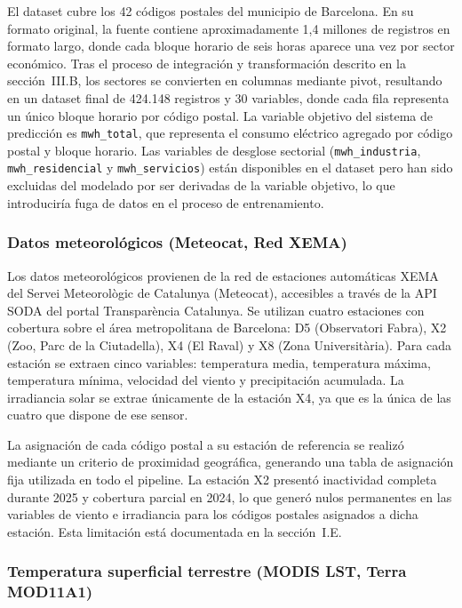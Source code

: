 \documentclass[12pt, a4paper]{article}
\begin{document}
El dataset cubre los 42 códigos postales del municipio de Barcelona. En su formato original, la fuente contiene aproximadamente 1,4 millones de registros en formato largo, donde cada bloque horario de seis horas aparece una vez por sector económico. Tras el proceso de integración y transformación descrito en la sección~III.B, los sectores se convierten en columnas mediante pivot, resultando en un dataset final de 424.148 registros y 30 variables, donde cada fila representa un único bloque horario por código postal. La variable objetivo del sistema de predicción es \texttt{mwh\_total}, que representa el consumo eléctrico agregado por código postal y bloque horario. Las variables de desglose sectorial (\texttt{mwh\_industria}, \texttt{mwh\_residencial} y \texttt{mwh\_servicios}) están disponibles en el dataset pero han sido excluidas del modelado por ser derivadas de la variable objetivo, lo que introduciría fuga de datos en el proceso de entrenamiento.

\subsubsection{Datos meteorológicos (Meteocat, Red XEMA)}

Los datos meteorológicos provienen de la red de estaciones automáticas XEMA del Servei Meteorològic de Catalunya (Meteocat), accesibles a través de la API SODA del portal Transparència Catalunya. Se utilizan cuatro estaciones con cobertura sobre el área metropolitana de Barcelona: D5 (Observatori Fabra), X2 (Zoo, Parc de la Ciutadella), X4 (El Raval) y X8 (Zona Universitària). Para cada estación se extraen cinco variables: temperatura media, temperatura máxima, temperatura mínima, velocidad del viento y precipitación acumulada. La irradiancia solar se extrae únicamente de la estación X4, ya que es la única de las cuatro que dispone de ese sensor.

La asignación de cada código postal a su estación de referencia se realizó mediante un criterio de proximidad geográfica, generando una tabla de asignación fija utilizada en todo el pipeline. La estación X2 presentó inactividad completa durante 2025 y cobertura parcial en 2024, lo que generó nulos permanentes en las variables de viento e irradiancia para los códigos postales asignados a dicha estación. Esta limitación está documentada en la sección~I.E.

\subsubsection{Temperatura superficial terrestre (MODIS LST, Terra MOD11A1)}
\end{document}

